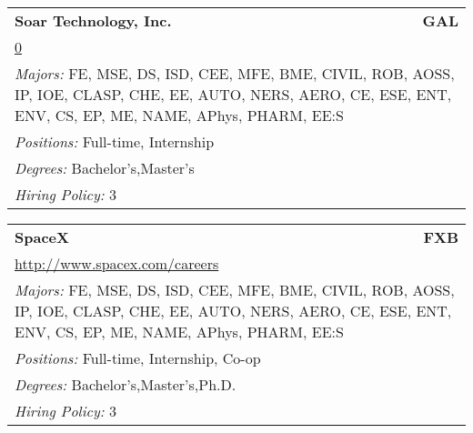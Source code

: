 \documentclass[twoside]{article}
\begin{document}
\begin{center}
\begin{multicols}{3}
\begin{FlushLeft}
\begin{minipage}{.9\columnwidth}
\end{minipage}
 
\begin{minipage}{.9\columnwidth}\begin{tabularx}{.95\columnwidth}{Xr}
                 {\Large\bf Soar Technology, Inc.} & {\Large\bf GAL}\\
    \multicolumn{2}{p{.95\columnwidth}}{\url{0}}\\
    \multicolumn{2}{p{.95\columnwidth}}{\emph{Majors:} FE, MSE, DS, ISD, CEE, MFE, BME, CIVIL, ROB, AOSS, IP, IOE, CLASP, CHE, EE, AUTO, NERS, AERO, CE, ESE, ENT, ENV, CS, EP, ME, NAME, APhys, PHARM, EE:S}\\
    \multicolumn{2}{p{.95\columnwidth}}{\emph{Positions:} Full-time, Internship}\\
    \multicolumn{2}{p{.95\columnwidth}}{\emph{Degrees:} Bachelor's,Master's}\\
    \multicolumn{2}{p{.95\columnwidth}}{\emph{Hiring Policy:} 3}\\
    \end{tabularx}
    
\end{minipage}
 
\begin{minipage}{.9\columnwidth}\begin{tabularx}{.95\columnwidth}{Xr}
                 {\Large\bf SpaceX} & {\Large\bf FXB}\\
    \multicolumn{2}{p{.95\columnwidth}}{\url{http://www.spacex.com/careers}}\\
    \multicolumn{2}{p{.95\columnwidth}}{\emph{Majors:} FE, MSE, DS, ISD, CEE, MFE, BME, CIVIL, ROB, AOSS, IP, IOE, CLASP, CHE, EE, AUTO, NERS, AERO, CE, ESE, ENT, ENV, CS, EP, ME, NAME, APhys, PHARM, EE:S}\\
    \multicolumn{2}{p{.95\columnwidth}}{\emph{Positions:} Full-time, Internship, Co-op}\\
    \multicolumn{2}{p{.95\columnwidth}}{\emph{Degrees:} Bachelor's,Master's,Ph.D.}\\
    \multicolumn{2}{p{.95\columnwidth}}{\emph{Hiring Policy:} 3}\\
    \end{tabularx}
    
\end{minipage}
 

\end{FlushLeft}
\end{multicols}
\end{center}
\end{document}
